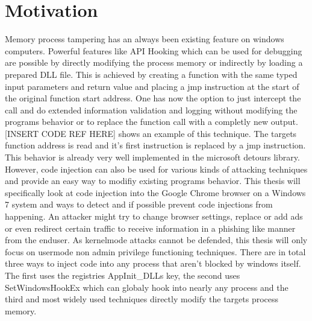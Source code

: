 \section{Motivation}

Memory process tampering has an always been existing feature on windows computers. Powerful features like API Hooking which can be used for debugging are possible by directly modifying the process memory or indirectly by loading a prepared DLL file. This is achieved by creating a function with the same typed input parameters and return value and placing a jmp instruction at the start of the original function start address. One has now the option to just intercept the call and do extended information validation and logging without modifying the programs behavior or to replace the function call with a completly new output. [INSERT CODE REF HERE] shows an example of this technique. The targets function address is read and it's first instruction is replaced by a jmp instruction. This behavior is already very well implemented in the microsoft detours library\cite{msdetours}.
However, code injection can also be used for various kinds of attacking techniques and provide an easy way to modifiy existing programs behavior. This thesis will specifically look at code injection into the Google Chrome browser on a Windows 7 system and ways to detect and if possible prevent code injections from happening. An attacker might try to change browser settings, replace or add ads or even redirect certain traffic to receive information in a phishing like manner from the enduser. As kernelmode attacks cannot be defended, this thesis will only focus on usermode non admin privilege functioning techniques. There are in total three ways to inject code into any process that aren't blocked by windows itself. The first
uses the registries AppInit\_DLLs key, the second uses SetWindowsHookEx which can globaly hook into nearly any process and the third and most widely used techniques directly modify the targets process memory.

